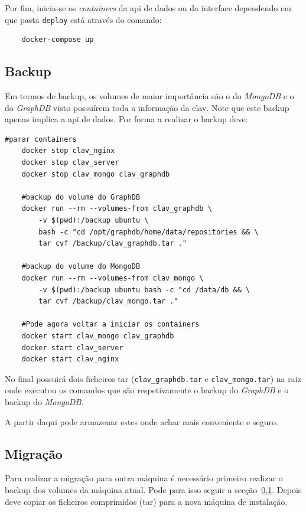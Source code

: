 Por fim, inicia-se os \textit{containers} da \acrshort{api} de dados ou da interface dependendo em que pasta \texttt{deploy} está através do comando:
\footnotesize
\begin{verbatim}
    docker-compose up
\end{verbatim}
\normalsize

\subsection{Backup}\label{sec:inst-backup}

Em termos de backup, os volumes de maior importância são o do \textit{MongoDB} e o do \textit{GraphDB} visto possuírem toda a informação da \acrshort{clav}. Note que este backup apenas implica a \acrshort{api} de dados. Por forma a realizar o backup deve:
\begin{lstlisting}[caption=Backup dos volumes do \textit{docker}]
    #parar containers
    docker stop clav_nginx
    docker stop clav_server
    docker stop clav_mongo clav_graphdb
    
    #backup do volume do GraphDB
    docker run --rm --volumes-from clav_graphdb \
        -v $(pwd):/backup ubuntu \
        bash -c "cd /opt/graphdb/home/data/repositories && \
        tar cvf /backup/clav_graphdb.tar ."
        
    #backup do volume do MongoDB
    docker run --rm --volumes-from clav_mongo \
        -v $(pwd):/backup ubuntu bash -c "cd /data/db && \
        tar cvf /backup/clav_mongo.tar ."
        
    #Pode agora voltar a iniciar os containers
    docker start clav_mongo clav_graphdb
    docker start clav_server
    docker start clav_nginx
\end{lstlisting}

No final possuirá dois ficheiros \acrshort{tar} (\texttt{clav\_graphdb.tar} e \texttt{clav\_mongo.tar}) na raiz onde executou os comandos que são respetivamente o backup do \textit{GraphDB} e o backup do \textit{MongoDB}.

A partir daqui pode armazenar estes onde achar mais conveniente e seguro.

\subsection{Migração}\label{sec:inst-migracao}

Para realizar a migração para outra máquina é necessário primeiro realizar o backup dos volumes da máquina atual. Pode para isso seguir a secção~\ref{sec:inst-backup}. Depois deve copiar os ficheiros comprimidos (\acrshort{tar}) para a nova máquina de instalação.


